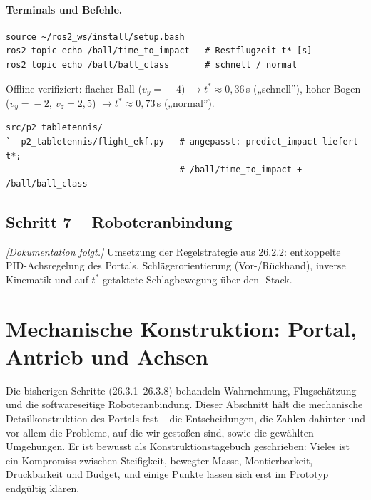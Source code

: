 \paragraph{Terminals und Befehle.}
\begin{lstlisting}[style=bash,caption={Terminal 2 -- Restflugzeit und Ballklasse mitlesen}]
source ~/ros2_ws/install/setup.bash
ros2 topic echo /ball/time_to_impact   # Restflugzeit t* [s]
ros2 topic echo /ball/ball_class       # schnell / normal
\end{lstlisting}
\noindent Offline verifiziert: flacher Ball ($v_y\!=\!-4$) $\to t^\ast\!\approx\!0{,}36\,$s
(„schnell''), hoher Bogen ($v_y\!=\!-2,\ v_z\!=\!2{,}5$) $\to t^\ast\!\approx\!0{,}73\,$s
(„normal'').
\begin{lstlisting}[style=bash,caption={\code{ros2\_ws}-Delta nach Schritt 6 (\# angepasst)}]
src/p2_tabletennis/
`- p2_tabletennis/flight_ekf.py   # angepasst: predict_impact liefert t*;
                                  # /ball/time_to_impact + /ball/ball_class
\end{lstlisting}

\subsection{Schritt 7 -- Roboteranbindung}
\emph{[Dokumentation folgt.]} Umsetzung der Regelstrategie aus 26.2.2: entkoppelte
PID-Achsregelung des Portals, Schlägerorientierung (Vor-/Rückhand), inverse
Kinematik und auf $t^\ast$ getaktete Schlagbewegung über den
-Stack.

\section{Mechanische Konstruktion: Portal, Antrieb und Achsen}
\label{sec:ttr-mechanik}

Die bisherigen Schritte (26.3.1--26.3.8) behandeln Wahrnehmung, Flugsch\"atzung
und die softwareseitige Roboteranbindung. Dieser Abschnitt h\"alt die
mechanische Detailkonstruktion des Portals fest -- die Entscheidungen, die
Zahlen dahinter und vor allem die Probleme, auf die wir gesto\ss en sind, sowie
die gew\"ahlten Umgehungen. Er ist bewusst als Konstruktionstagebuch
geschrieben: Vieles ist ein Kompromiss zwischen Steifigkeit, bewegter Masse,
Montierbarkeit, Druckbarkeit und Budget, und einige Punkte lassen sich erst im
Prototyp endg\"ultig kl\"aren.

